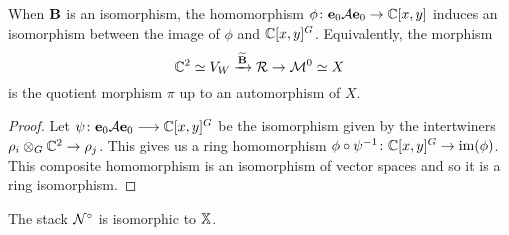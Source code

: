 \documentclass{amsart}
\theoremstyle{definition}
\newcommand\VW{V_W}
\begin{document}
\begin{lemma}\label{lem:e0Ae0}
When $\mathbf{B}$ is an isomorphism, the homomorphism $\phi \colon \mathbf{e}_0 \mathcal{A} \mathbf{e}_0 \rightarrow \mathbb{C}[x,y]$
induces an isomorphism between the image of $\phi$ and $\mathbb{C}[x,y]^G$.
Equivalently, the morphism $$\bC^2 \simeq \VW \xrightarrow{\widetilde{\bfB}} \cR \rightarrow \cM^0 \simeq X$$ is the quotient morphism $\pi$ up to an automorphism of $X$.
\end{lemma}

\begin{proof}
Let $\psi \colon \mathbf{e}_0 \mathcal{A} \mathbf{e}_0 \longrightarrow \mathbb{C}[x,y]^G$ be the isomorphism given by the intertwiners $\rho_i \otimes_G \mathbb{C}^2 \rightarrow \rho_j$.
This gives us a ring homomorphism $\phi \circ \psi^{-1} \colon \mathbb{C}[x,y]^G \rightarrow \text{im}(\phi)$.
This composite homomorphism is an isomorphism of vector spaces and so it is a ring isomorphism.
\end{proof}

\begin{theorem}\label{thm:tannaka}
The stack ${\mathcal{N}}^\circ$ is isomorphic to $\mathbb{X}$.
\end{theorem}
\end{document}

